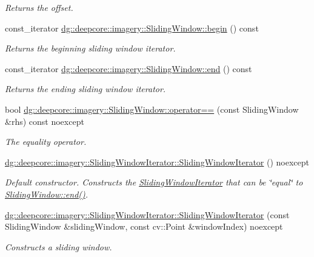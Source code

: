 \begin{DoxyCompactItemize}
\begin{DoxyCompactList}\small\item\em Returns the offset. \end{DoxyCompactList}\item 
const\+\_\+iterator \hyperlink{group___imagery_module_ga935a8a28313d10b815762aeb92e78629}{dg\+::deepcore\+::imagery\+::\+Sliding\+Window\+::begin} () const 
\begin{DoxyCompactList}\small\item\em Returns the beginning sliding window iterator. \end{DoxyCompactList}\item 
const\+\_\+iterator \hyperlink{group___imagery_module_ga1c962ee19d65114b9213d2aea33503a6}{dg\+::deepcore\+::imagery\+::\+Sliding\+Window\+::end} () const 
\begin{DoxyCompactList}\small\item\em Returns the ending sliding window iterator. \end{DoxyCompactList}\item 
bool \hyperlink{group___imagery_module_ga771dbe2b22ec6f714c0c707ed7a63c1f}{dg\+::deepcore\+::imagery\+::\+Sliding\+Window\+::operator==} (const Sliding\+Window \&rhs) const noexcept
\begin{DoxyCompactList}\small\item\em The equality operator. \end{DoxyCompactList}\item 
\hyperlink{group___imagery_module_gaa72789bec6d0d49fe87408e224739d23}{dg\+::deepcore\+::imagery\+::\+Sliding\+Window\+Iterator\+::\+Sliding\+Window\+Iterator} () noexcept
\begin{DoxyCompactList}\small\item\em Default constructor. Constructs the \hyperlink{classdg_1_1deepcore_1_1imagery_1_1_sliding_window_iterator}{Sliding\+Window\+Iterator} that can be \char`\"{}equal\char`\"{} to \hyperlink{group___imagery_module_ga1c962ee19d65114b9213d2aea33503a6}{Sliding\+Window\+::end()}. \end{DoxyCompactList}\item 
\hyperlink{group___imagery_module_ga7493aa55008e090f05fcb47bd53d6098}{dg\+::deepcore\+::imagery\+::\+Sliding\+Window\+Iterator\+::\+Sliding\+Window\+Iterator} (const Sliding\+Window \&sliding\+Window, const cv\+::\+Point \&window\+Index) noexcept
\begin{DoxyCompactList}\small\item\em Constructs a sliding window. \end{DoxyCompactList}\item 

\end{DoxyCompactItemize}
